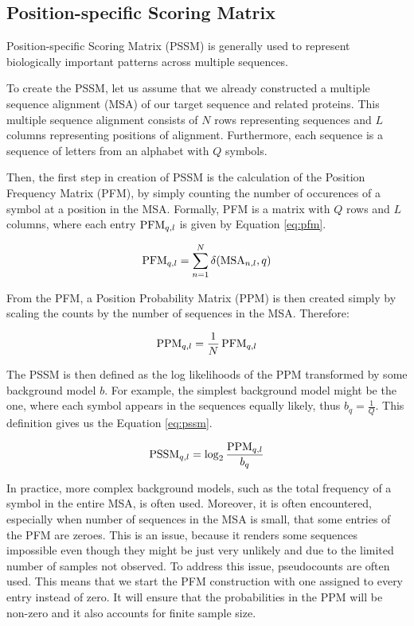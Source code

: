\subsection{Position-specific Scoring Matrix}

Position-specific Scoring Matrix (PSSM) is generally used to represent biologically important patterns across multiple sequences. 

To create the PSSM, let us assume that we already constructed a multiple sequence alignment (MSA) of our target sequence and related proteins.
This multiple sequence alignment consists of $N$ rows representing sequences and $L$ columns representing positions of alignment.
Furthermore, each sequence is a sequence of letters from an alphabet with $Q$ symbols.

Then, the first step in creation of PSSM is the calculation of the Position Frequency Matrix (PFM), by simply counting the number of occurences of a symbol at a position in the MSA.
Formally, PFM is a matrix with $Q$ rows and $L$ columns, where each entry $\operatorname{PFM}_{q, l}$ is given by Equation \ref{eq:pfm}.

\begin{equation}
    \operatorname{PFM}_{q, l} = \sum_{n = 1}^{N} \delta(\operatorname{MSA}_{n, l}, q)
    \label{eq:pfm}
\end{equation}

From the PFM, a Position Probability Matrix (PPM) is then created simply by scaling the counts by the number of sequences in the MSA.
Therefore:

\begin{equation}
    \operatorname{PPM}_{q, l} = \frac{1}{N} \operatorname{PFM}_{q, l}
\end{equation}

The PSSM is then defined as the log likelihoods of the PPM transformed by some background model $b$.
For example, the simplest background model might be the one, where each symbol appears in the sequences equally likely, thus $b_q = \frac{1}{Q}$.
This definition gives us the Equation \ref{eq:pssm}.

\begin{equation}
    \operatorname{PSSM}_{q, l} = \log_2 \frac{\operatorname{PPM}_{q, l}}{b_q}
    \label{eq:pssm}
\end{equation}

In practice, more complex background models, such as the total frequency of a symbol in the entire MSA, is often used.
Moreover, it is often encountered, especially when number of sequences in the MSA is small, that some entries of the PFM are zeroes.
This is an issue, because it renders some sequences impossible even though they might be just very unlikely and due to the limited number of samples not observed.
To address this issue, pseudocounts are often used.
This means that we start the PFM construction with one assigned to every entry instead of zero.
It will ensure that the probabilities in the PPM will be non-zero and it also accounts for finite sample size.


